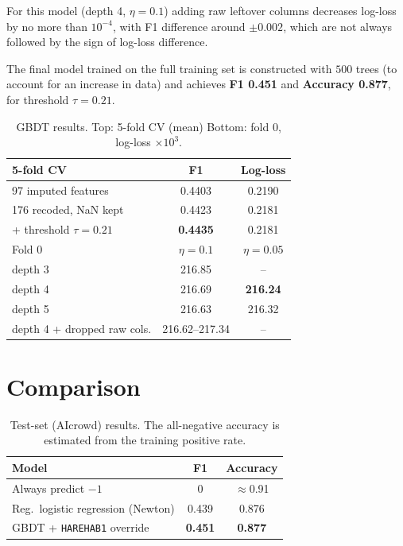 \documentclass[10pt,conference,compsocconf]{IEEEtran}
\begin{document}
For this model (depth 4, $\eta = 0.1$) adding raw leftover columns decreases log-loss by no more than $10^{-4}$, with F1 difference around $\pm 0.002$, which are not always followed by the sign of log-loss difference.

The final model trained on the full training set is constructed with $500$ trees (to account for an increase in data) and achieves \textbf{F1 0.451} and \textbf{Accuracy 0.877}, for threshold $\tau = 0.21$.

\begin{table}[tbp]
  \centering
  \footnotesize
  \caption{GBDT results. Top: 5-fold CV (mean)
  Bottom: fold 0, log-loss $\times10^3$.}
  \label{tab:gbdt}
  \setlength{\tabcolsep}{4pt}
  \begin{tabular}{@{}lcc@{}}
    \toprule
    5-fold CV & F1 & Log-loss \\
    \midrule
    97 imputed features & 0.4403 & 0.2190 \\
    176 recoded, NaN kept & 0.4423 & 0.2181 \\
    \quad + threshold $\tau=0.21$ & \textbf{0.4435} & 0.2181 \\
    \midrule
    Fold 0 & $\eta=0.1$ & $\eta=0.05$ \\
    \midrule
    depth 3 & 216.85 & -- \\
    depth 4 & 216.69 & \textbf{216.24} \\
    depth 5 & 216.63 & 216.32 \\
    depth 4 + dropped raw cols. & 216.62--217.34 & -- \\
    \bottomrule
  \end{tabular}
\end{table}

\section{Comparison}
\label{sec:compare}

\begin{table}[tbp]
  \centering
  \footnotesize
  \caption{Test-set (AIcrowd) results. The all-negative accuracy is
  estimated from the training positive rate.}
  \label{tab:compare}
  \begin{tabular}{@{}lcc@{}}
    \toprule
    Model & F1 & Accuracy \\
    \midrule
    Always predict $-1$ & 0 & $\approx$0.91 \\
    Reg.\ logistic regression (Newton) & 0.439 & 0.876 \\
    GBDT + \texttt{HAREHAB1} override & \textbf{0.451} & \textbf{0.877} \\
    \bottomrule
  \end{tabular}
\end{table}
\end{document}
